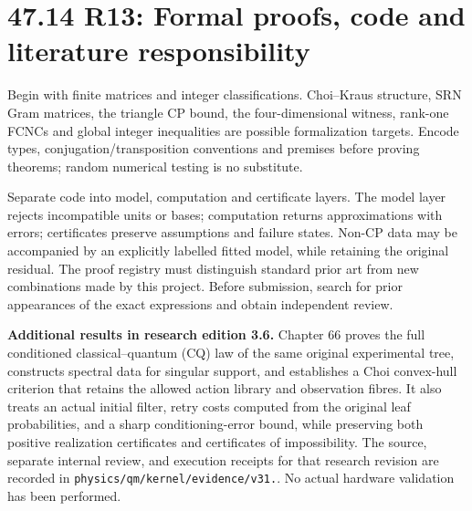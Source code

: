 \documentclass[
  11pt,
  oneside]{book}
\begin{document}
\section{47.14 R13: Formal proofs, code and literature responsibility}

Begin with finite matrices and integer classifications. Choi--Kraus
structure, SRN Gram matrices, the triangle CP bound, the
four-dimensional witness, rank-one FCNCs and global integer inequalities
are possible formalization targets. Encode types,
conjugation/transposition conventions and premises before proving
theorems; random numerical testing is no substitute.

Separate code into model, computation and certificate layers. The model
layer rejects incompatible units or bases; computation returns
approximations with errors; certificates preserve assumptions and
failure states. Non-CP data may be accompanied by an explicitly labelled
fitted model, while retaining the original residual. The proof registry
must distinguish standard prior art from new combinations made by this
project. Before submission, search for prior appearances of the exact
expressions and obtain independent review.

\textbf{Additional results in research edition 3.6.} Chapter 66 proves
the full conditioned classical--quantum (CQ) law of the same original
experimental tree, constructs spectral data for singular support, and
establishes a Choi convex-hull criterion that retains the allowed action
library and observation fibres. It also treats an actual initial filter,
retry costs computed from the original leaf probabilities, and a sharp
conditioning-error bound, while preserving both positive realization
certificates and certificates of impossibility. The source, separate
internal review, and execution receipts for that research revision are
recorded in \texttt{physics/\allowbreak qm/\allowbreak kernel/\allowbreak evidence/\allowbreak v31.}. No actual
hardware validation has been performed.
\end{document}
